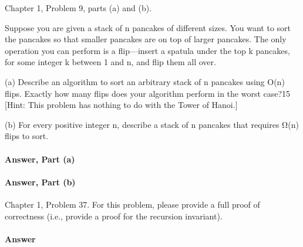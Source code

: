 \documentclass{article}
\begin{document}
\collab{\todo{}}

Chapter 1, Problem 9, parts (a) and (b).

Suppose you are given a stack of n pancakes of different sizes. You want to
sort the pancakes so that smaller pancakes are on top of larger pancakes.
The only operation you can perform is a flip—insert a spatula under the
top k pancakes, for some integer k between 1 and n, and flip them all over.

(a) Describe an algorithm to sort an arbitrary stack of n pancakes using
O(n) flips. Exactly how many flips does your algorithm perform in the
worst case?15 [Hint: This problem has nothing to do with the Tower of
Hanoi.]

(b) For every positive integer n, describe a stack of n pancakes that requires
Ω(n) flips to sort.

\paragraph{Answer, Part (a)}

\todo{}

\paragraph{Answer, Part (b)}

\todo{}

\collab{\todo{}}

Chapter 1, Problem 37.  For this problem, please provide a full proof of
correctness (i.e., provide a proof for the recursion invariant).

\paragraph{Answer}
\todo{}
\end{document}
